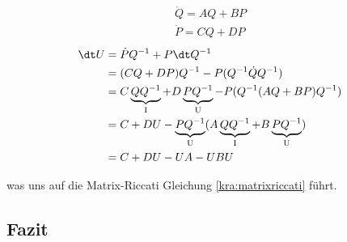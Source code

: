 \begin{align*}
    \dot{Q} = AQ + BP \\
    \dot{P} = CQ + DP
\end{align*}
\begin{equation}
    \begin{split}
        \dt U   &= \dot{P} Q^{-1} + P \dt Q^{-1} \\
        &= (CQ + DP) Q^{-1} - P (Q^{-1} \dot{Q} Q^{-1}) \\
        &= C\underbrace{QQ^{-1}}_\text{I} + D\underbrace{PQ^{-1}}_\text{U} - P(Q^{-1} (AQ + BP) Q^{-1}) \\
        &= C + DU - \underbrace{PQ^{-1}}_\text{U}(A\underbrace{QQ^{-1}}_\text{I} + B\underbrace{PQ^{-1}}_\text{U}) \\
        &= C  + DU - UA - UBU
    \end{split}
\end{equation}

was uns auf die Matrix-Riccati Gleichung \ref{kra:matrixriccati} führt.


\subsection{Fazit}
